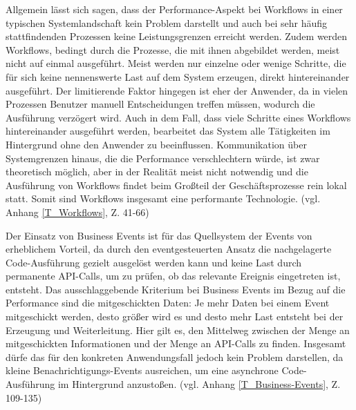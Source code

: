 Allgemein lässt sich sagen, dass der Performance-Aspekt bei Workflows in einer typischen Systemlandschaft kein Problem darstellt und auch bei sehr häufig stattfindenden Prozessen keine Leistungsgrenzen erreicht werden. Zudem werden Workflows, bedingt durch die Prozesse, die mit ihnen abgebildet werden, meist nicht auf einmal ausgeführt. Meist werden nur einzelne oder wenige Schritte, die für sich keine nennenswerte Last auf dem System erzeugen, direkt hintereinander ausgeführt. Der limitierende Faktor hingegen ist eher der Anwender, da in vielen Prozessen Benutzer manuell Entscheidungen treffen müssen, wodurch die Ausführung verzögert wird. Auch in dem Fall, dass viele Schritte eines Workflows hintereinander ausgeführt werden, bearbeitet das System alle Tätigkeiten im Hintergrund ohne den Anwender zu beeinflussen. Kommunikation über Systemgrenzen hinaus, die die Performance verschlechtern würde, ist zwar theoretisch möglich, aber in der Realität meist nicht notwendig und die Ausführung von Workflows findet beim Gro{\ss}teil der Geschäftsprozesse rein lokal statt. Somit sind Workflows insgesamt eine performante Technologie. (vgl. Anhang \ref{T_Workflows}, Z. 41-66)

Der Einsatz von Business Events ist für das Quellsystem der Events von erheblichem Vorteil, da durch den eventgesteuerten Ansatz die nachgelagerte Code-Ausführung gezielt ausgelöst werden kann und keine Last durch permanente API-Calls, um zu prüfen, ob das relevante Ereignis eingetreten ist, entsteht. Das ausschlaggebende Kriterium bei Business Events im Bezug auf die Performance sind die mitgeschickten Daten: Je mehr Daten bei einem Event mitgeschickt werden, desto grö{\ss}er wird es und desto mehr Last entsteht bei der Erzeugung und Weiterleitung. Hier gilt es, den Mittelweg zwischen der Menge an mitgeschickten Informationen und der Menge an API-Calls zu finden. Insgesamt dürfe das für den konkreten Anwendungsfall jedoch kein Problem darstellen, da kleine Benachrichtigungs-Events ausreichen, um eine asynchrone Code-Ausführung im Hintergrund anzusto{\ss}en. (vgl. Anhang \ref{T_Business-Events}, Z. 109-135)

